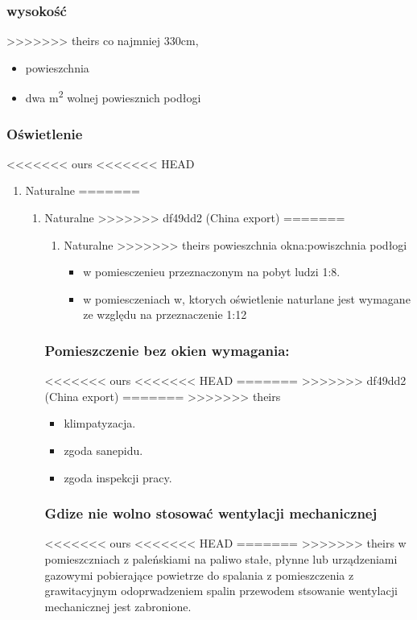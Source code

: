 \documentclass[11pt]{article}
\begin{document}
\subsubsection{wysokość}
\label{sec:org1403e45}
>>>>>>> theirs
co najmniej 330cm,
\begin{itemize}
\item powieszchnia
\item dwa m\textsuperscript{2} wolnej powiesznich podłogi
\end{itemize}
\subsubsection{Oświetlenie}
<<<<<<< ours
<<<<<<< HEAD
\label{sec:org4656ca2}
\begin{enumerate}
\item Naturalne
\label{sec:orgde98694}
=======
\label{sec:org2b6f020}
\begin{enumerate}
\item Naturalne
\label{sec:org776f493}
>>>>>>> df49dd2 (China export)
=======
\label{sec:org2b6f020}
\begin{enumerate}
\item Naturalne
\label{sec:org776f493}
>>>>>>> theirs
powieszchnia okna:powiszchnia podłogi
\begin{itemize}
\item w pomiesczenieu przeznaczonym na pobyt ludzi 1:8.
\item w pomiesczeniach w, ktorych oświetlenie naturlane jest wymagane ze względu na przeznaczenie 1:12
\end{itemize}
\end{enumerate}
\subsubsection{Pomieszczenie bez okien wymagania:}
<<<<<<< ours
<<<<<<< HEAD
\label{sec:orga9ad77b}
=======
\label{sec:orgbe9f0a5}
>>>>>>> df49dd2 (China export)
=======
\label{sec:orgbe9f0a5}
>>>>>>> theirs
\begin{itemize}
\item klimpatyzacja.
\item zgoda sanepidu.
\item zgoda inspekcji pracy.
\end{itemize}
\subsubsection{Gdize nie wolno stosować wentylacji mechanicznej}
<<<<<<< ours
<<<<<<< HEAD
\label{sec:org08271c0}
=======
\label{sec:orgcb073b6}
>>>>>>> theirs
w pomieszczniach z paleńskiami na paliwo stałe, płynne lub urządzeniami gazowymi pobierające powietrze do spalania z pomieszczenia z grawitacyjnym odoprwadzeniem spalin przewodem stsowanie wentylacji mechanicznej jest zabronione.

\end{enumerate}
\end{enumerate}
\end{document}
